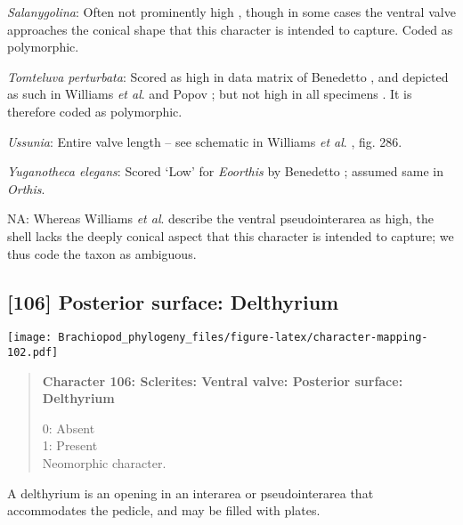 \documentclass[openany]{book}
\theoremstyle{definition}
\theoremstyle{definition}
\theoremstyle{definition}
\theoremstyle{remark}
\begin{document}
\hypertarget{Salanygolina-coding-105}{}
\emph{Salanygolina}: Often not prominently high
\citep{Skovsted2003EarlyCambrian, Balthasar2004Shellstructure}, though
in some cases \citep[e.g.][]{Butler2015Exceptionallypreserved} the
ventral valve approaches the conical shape that this character is
intended to capture. Coded as polymorphic.

\hypertarget{Tomteluva_perturbata-coding-105}{}
\emph{Tomteluva perturbata}: Scored as high in data matrix of Benedetto
\citeyearpar{Benedetto2009iChaniella}, and depicted as such in Williams
\emph{et al}. \citeyearpar[fig.
125]{Williams2000LinguliformeaCraniiformea} and Popov \citeyearpar[fig.
1]{Popov1992TheCambrian}; but not high in all specimens
\citep[e.g.][fig. 126]{Williams2000LinguliformeaCraniiformea}. It is
therefore coded as polymorphic.

\hypertarget{Ussunia-coding-105}{}
\emph{Ussunia}: Entire valve length -- see schematic in Williams
\emph{et al}. \citeyearpar{Williams1997Introduction}, fig. 286.

\hypertarget{Yuganotheca_elegans-coding-105}{}
\emph{Yuganotheca elegans}: Scored `Low' for \emph{Eoorthis} by
Benedetto \citeyearpar{Benedetto2009iChaniella}; assumed same in
\emph{Orthis}.

\hypertarget{NA-coding-105}{}
NA: Whereas Williams \emph{et al}.
\citeyearpar[p.~156]{Williams2000LinguliformeaCraniiformea} describe the
ventral pseudointerarea as high, the shell lacks the deeply conical
aspect that this character is intended to capture; we thus code the
taxon as ambiguous.

\subsection*{{[}106{]} Posterior surface:
Delthyrium}\label{posterior-surface-delthyrium}

\texttt{[image: Brachiopod\_phylogeny\_files/figure-latex/character-mapping-102.pdf]}

\begin{quote}
\textbf{Character 106: Sclerites: Ventral valve: Posterior surface:
Delthyrium}

0: Absent\\
1: Present\\
Neomorphic character.
\end{quote}

A delthyrium is an opening in an interarea or pseudointerarea that
accommodates the pedicle, and may be filled with plates.
\end{document}
